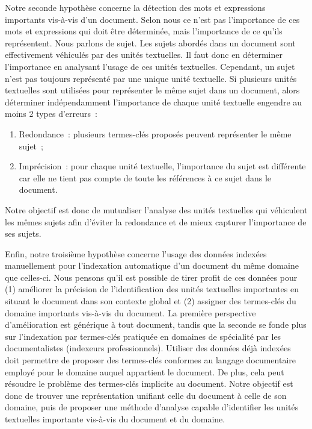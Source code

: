     Notre seconde hypothèse concerne la détection des mots et expressions
    importants vis-à-vis d'un document. Selon nous ce n'est pas l'importance de
    ces mots et expressions qui doit être déterminée, mais l'importance de ce
    qu'ils représentent. Nous parlons de sujet.
    Les sujets abordés dans un document sont effectivement véhiculés par des
    unités textuelles. Il faut donc en déterminer l'importance en analysant
    l'usage de ces unités textuelles. Cependant, un sujet n'est pas toujours
    représenté par une unique unité textuelle. Si plusieurs unités textuelles
    sont utilisées pour représenter le même sujet dans un document, alors
    déterminer indépendamment l'importance de chaque unité textuelle engendre au
    moins 2 types d'erreurs~:
    \begin{enumerate}
      \item{Redondance~: plusieurs termes-clés proposés peuvent représenter le
            même sujet~;}
      \item{Imprécision~: pour chaque unité textuelle, l'importance du sujet est
            différente car elle ne tient pas compte de toute les références à ce
            sujet dans le document.}
    \end{enumerate}
    Notre objectif est donc de mutualiser l'analyse des unités textuelles qui
    véhiculent les mêmes sujets afin d'éviter la redondance et de mieux capturer
    l'importance de ses sujets.
    
    Enfin, notre troisième hypothèse concerne l'usage des données indexées
    manuellement pour l'indexation automatique d'un document du même domaine que
    celles-ci. Nous pensons qu'il est possible de tirer profit de ces données
    pour (1) améliorer la précision de l'identification des unités textuelles
    importantes en situant le document dans son contexte global et (2)
    assigner des termes-clés du domaine importants vis-à-vis du document.
    La première perspective d'amélioration est générique à tout document, tandis
    que la seconde se fonde plus sur l'indexation par termes-clés pratiquée en
    domaines de spécialité par les documentalistes (indexeurs professionnels). Utiliser des
    données déjà indexées doit permettre de proposer des termes-clés conformes
    au langage documentaire employé pour le domaine auquel appartient le
    document. De plus, cela peut résoudre le problème des termes-clés implicite
    au document.
    Notre objectif est donc de trouver une représentation unifiant celle du
    document à celle de son domaine, puis de proposer une méthode d'analyse
    capable d'identifier les unités textuelles importante vis-à-vis du document
    et du domaine.

